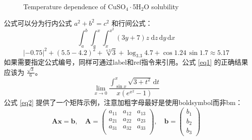 \documentclass{xmu}
\begin{document}
\begin{figure}[!htbp]
    \centering
    \caption{Temperature dependence of CuSO\(_4\cdot\)5H\(_2\)O solubility}\label{plot}
\end{figure}
公式可以分为行内公式 $a^2+b^2=c^2$ 和行间公式：
$$
    \int_a^b\int_a^x\int_x^{x^2}(3y+7)z\;\mathrm{d}z\,\mathrm{d}y\,\mathrm{d}x
$$
$$
    |-0.75|^{2}+(5.5-4.2)^2+\sqrt[4.2]{3}+\log_{3.3}{4.7}+\cos1.24\,\sin1.7\approx5.17
$$
如果需要指定公式编号，同样可通过label和ref指令来引用。公式 \ref{eq1} 的正确结果应该为 $\frac{\sqrt{3}}{6}$。
\begin{equation}\label{eq1}
    \lim_{x\to0}\frac{\displaystyle{\int_{\sin x}^x\sqrt{3+t^2}\,\mathrm{d}t}}{x(e^{x^2}-1)}
\end{equation}
公式 \ref{eq2} 提供了一个矩阵示例，注意加粗字母最好是使用boldsymbol而非bm：
\begin{equation}\label{eq2}
    \boldsymbol{Ax} = \boldsymbol{b},\quad\boldsymbol{A} = \left(\begin{array}{ccc}
            a_{11} & a_{12} & a_{13} \\
            a_{21} & a_{22} & a_{23} \\
            a_{31} & a_{32} & a_{33} \\
        \end{array}\right),\quad \boldsymbol{b}=\left(\begin{array}{c}
            b_1 \\ b_2 \\ b_3\end{array}\right)
\end{equation}
\end{document}
